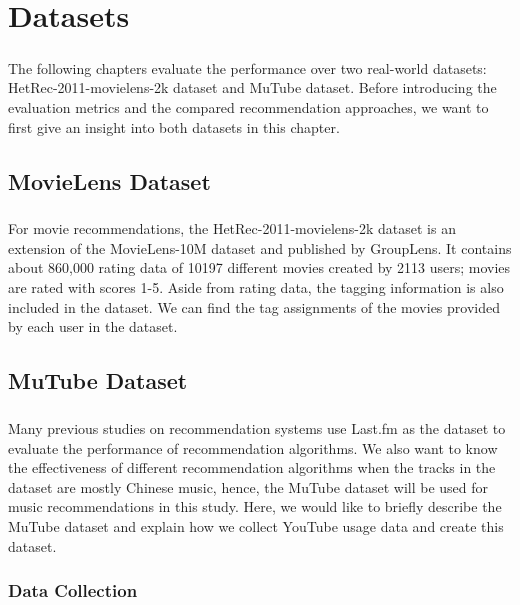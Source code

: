 \documentclass[a4paper,12pt]{report}
\begin{document}
\chapter{Datasets}
\paragraph{}
The following chapters evaluate the performance over two real-world datasets: HetRec-2011-movielens-2k dataset and MuTube dataset. Before introducing the evaluation metrics and the compared recommendation approaches, we want to first give an insight into both datasets in this chapter. 
\section{MovieLens Dataset}
\paragraph{}
For movie recommendations, the HetRec-2011-movielens-2k dataset is an extension of the MovieLens-10M dataset and published by GroupLens. It contains about 860,000 rating data of 10197 different movies created by 2113 users; movies are rated with scores 1-5. Aside from rating data, the tagging information is also included in the dataset. We can find the tag assignments of the movies provided by each user in the dataset. 
\section{MuTube Dataset}
\paragraph{}
Many previous studies on recommendation systems use Last.fm as the dataset to evaluate the performance of recommendation algorithms. We also want to know the effectiveness of different recommendation algorithms when the tracks in the dataset are mostly Chinese music, hence, the MuTube dataset will be used for music recommendations in this study. Here, we would like to briefly describe the MuTube dataset and explain how we collect YouTube usage data and create this dataset.

\subsection{Data Collection}
\end{document}
